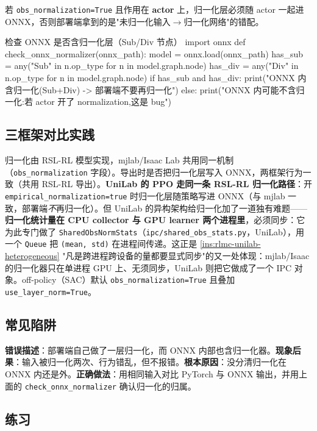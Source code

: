 若 \verb|obs_normalization=True| 且作用在 \textbf{actor} 上，归一化层必须随 actor 一起进 ONNX，否则部署端拿到的是"未归一化输入$\to$归一化网络"的错配。

\begin{codebox}[Python]{检查 ONNX 是否含归一化层（Sub/Div 节点）}
import onnx
def check_onnx_normalizer(onnx_path):
    model = onnx.load(onnx_path)
    has_sub = any("Sub" in n.op_type for n in model.graph.node)
    has_div = any("Div" in n.op_type for n in model.graph.node)
    if has_sub and has_div:
        print("ONNX 内含归一化(Sub+Div) -> 部署端不要再归一化")
    else:
        print("ONNX 内可能不含归一化:若 actor 开了 normalization,这是 bug")
\end{codebox}

\subsection{三框架对比实践}

归一化由 RSL-RL 模型实现，mjlab/Isaac Lab 共用同一机制（\verb|obs_normalization| 字段）。导出时是否把归一化层写入 ONNX，两框架行为一致（共用 RSL-RL 导出）。\textbf{UniLab 的 PPO 走同一条 RSL-RL 归一化路径}：开 \verb|empirical_normalization=true| 时归一化层随策略写进 ONNX（与 mjlab 一致，部署端\emph{不}再归一化）。但 UniLab 的异构架构给归一化加了一道独有难题——\textbf{归一化统计量在 CPU collector 与 GPU learner 两个进程里}，必须同步：它为此专门做了 \verb|SharedObsNormStats|（\verb|ipc/shared_obs_stats.py|，UniLab），用一个 \verb|Queue| 把 \verb|(mean, std)| 在进程间传递。这正是 \cref{ins:rlmc-unilab-heterogeneous} "凡是跨进程跨设备的量都要显式同步"的又一处体现：mjlab/Isaac 的归一化器只在单进程 GPU 上、无须同步，UniLab 则把它做成了一个 IPC 对象。off-policy（SAC）默认 \verb|obs_normalization=True| 且叠加 \verb|use_layer_norm=True|。

\subsection{常见陷阱}

\begin{pitfall}[双重归一化]
\textbf{错误描述}：部署端自己做了一层归一化，而 ONNX 内部也含归一化器。\textbf{现象后果}：输入被归一化两次、行为错乱，但不报错。\textbf{根本原因}：没分清归一化在 ONNX 内还是外。\textbf{正确做法}：用相同输入对比 PyTorch 与 ONNX 输出，并用上面的 \verb|check_onnx_normalizer| 确认归一化的归属。
\end{pitfall}

\subsection{练习}

